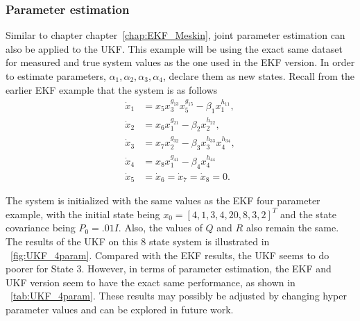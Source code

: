

\clearpage
\subsubsection{Parameter estimation}

Similar to chapter chapter~\ref{chap:EKF_Meskin}, joint parameter estimation can also be applied to the UKF. This example will be using the exact same dataset for measured and true system values as the one used in the EKF version. In order to estimate parameters, $\alpha_1,\alpha_2, \alpha_3, \alpha_4$, declare them as new states. Recall from the earlier EKF example that the system is as follows
\begin{align*}
\dot x_1 &= x_5  x_3^{g_{13}} x_5^{g_{15}} - \beta_1 x_1^{h_{11}} , \\
\dot x_2 &= x_6  x_1^{g_{21}} - \beta_2 x_2^{h_{22}}, \\
\dot x_3 &= x_7  x_2^{g_{32}} - \beta_3 x_3^{h_{33}} x_4^{h_{34}}, \\
\dot x_4 &= x_8   x_1^{g_{41}} - \beta_4 x_4^{h_{44}} \\
\dot x_5 &= \dot x_6= \dot x_7 = \dot x_8 = 0.
\end{align*}

\noindent The system is initialized with the same values as the EKF four parameter example, with the initial state being $x_0 = [4, 1, 3, 4, 20, 8, 3, 2]^T$ and the state covariance being $P_0 = .01I$. Also, the values of $Q$ and $R$ also remain the same. The results of the UKF on this 8 state system is illustrated in ~\ref{fig:UKF_4param}. Compared with the EKF results, the UKF seems to do poorer for State 3. However, in terms of parameter estimation, the EKF and UKF version seem to have the exact same performance, as shown in ~\ref{tab:UKF_4param}. These results may possibly be adjusted by changing hyper parameter values and can be explored in future work.

